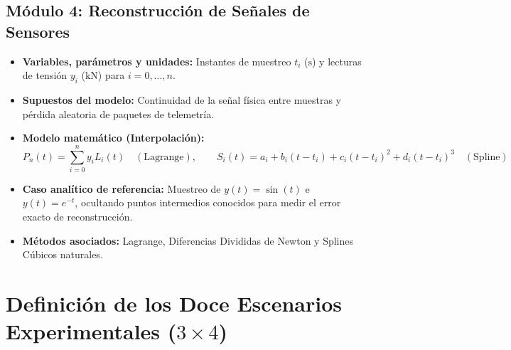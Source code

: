 \documentclass[a4paper,12pt]{article}
\begin{document}
\subsection{Módulo 4: Reconstrucción de Señales de Sensores}
\begin{itemize}
    \item \textbf{Variables, parámetros y unidades:} Instantes de muestreo $t_i$ ($\text{s}$) y lecturas de tensión $y_i$ ($\text{kN}$) para $i=0,\dots,n$.
    \item \textbf{Supuestos del modelo:} Continuidad de la señal física entre muestras y pérdida aleatoria de paquetes de telemetría.
    \item \textbf{Modelo matemático (Interpolación):}
    \begin{equation}
        P_n(t) = \sum_{i=0}^{n} y_i L_i(t) \quad (\text{Lagrange}), \qquad S_i(t) = a_i + b_i(t-t_i) + c_i(t-t_i)^2 + d_i(t-t_i)^3 \quad (\text{Spline})
    \end{equation}
    \item \textbf{Caso analítico de referencia:} Muestreo de $y(t) = \sin(t)$ e $y(t) = e^{-t}$, ocultando puntos intermedios conocidos para medir el error exacto de reconstrucción.
    \item \textbf{Métodos asociados:} Lagrange, Diferencias Divididas de Newton y Splines Cúbicos naturales.
\end{itemize}

\section{Definición de los Doce Escenarios Experimentales ($3 \times 4$)}
\end{document}
